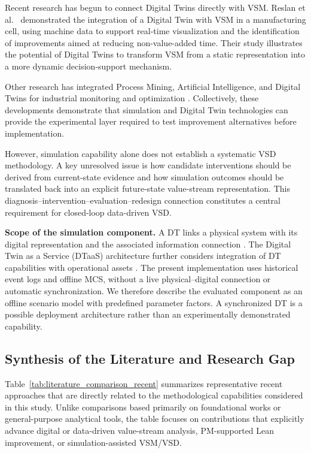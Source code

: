 \documentclass[pdflatex,iicol,Numbered,sn-basic]{sn-jnl}
\begin{document}
Recent research has begun to connect Digital Twins directly with VSM.
Reslan et al.~\cite{Reslan2025VSMDigitalTwin} demonstrated the integration of
a Digital Twin with VSM in a manufacturing cell, using machine data to support
real-time visualization and the identification of improvements aimed at
reducing non-value-added time. Their study illustrates the potential of
Digital Twins to transform VSM from a static representation into a more dynamic
decision-support mechanism.

Other research has integrated Process Mining, Artificial Intelligence, and
Digital Twins for industrial monitoring and optimization
\cite{Hamel2024PMIDT,Chen2023MultisensorDT,Chen2025RealtimeDT}. Collectively,
these developments demonstrate that simulation and Digital Twin technologies
can provide the experimental layer required to test improvement alternatives
before implementation.

However, simulation capability alone does not establish a systematic VSD
methodology. A key unresolved issue is how candidate interventions should be
derived from current-state evidence and how simulation outcomes should be
translated back into an explicit future-state value-stream representation.
This diagnosis--intervention--evaluation--redesign connection constitutes a
central requirement for closed-loop data-driven VSD.

\smallskip\noindent\textbf{Scope of the simulation component.}
A DT links a physical system with its digital representation and the associated information connection \cite{GrievesVickers2017}. The Digital Twin as a Service (DTaaS) architecture further considers integration of DT capabilities with operational assets \cite{Aheleroff2021DTaaS}. The present implementation uses historical event logs and offline MCS, without a live physical--digital connection or automatic synchronization. We therefore describe the evaluated component as an offline scenario model with predefined parameter factors. A synchronized DT is a possible deployment architecture rather than an experimentally demonstrated capability.

\subsection{Synthesis of the Literature and Research Gap}

Table~\ref{tab:literature_comparison_recent} summarizes representative recent
approaches that are directly related to the methodological capabilities
considered in this study. Unlike comparisons based primarily on foundational
works or general-purpose analytical tools, the table focuses on contributions
that explicitly advance digital or data-driven value-stream analysis,
PM-supported Lean improvement, or simulation-assisted VSM/VSD.
\end{document}
